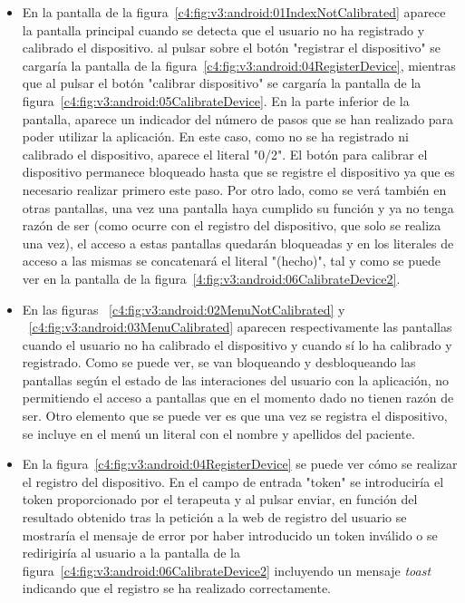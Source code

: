 \begin{itemize}
    \item En la pantalla de la figura~\ref{c4:fig:v3:android:01IndexNotCalibrated} aparece la pantalla principal cuando se detecta que el usuario no ha registrado y calibrado el dispositivo. al pulsar sobre el botón "registrar el dispositivo" se cargaría la pantalla de la figura~\ref{c4:fig:v3:android:04RegisterDevice}, mientras que al pulsar el botón "calibrar dispositivo" se cargaría la pantalla de la figura~\ref{c4:fig:v3:android:05CalibrateDevice}. En la parte inferior de la pantalla, aparece un indicador del número de pasos que se han realizado para poder utilizar la aplicación. En este caso, como no se ha registrado ni calibrado el dispositivo, aparece el literal "0/2". El botón para calibrar el dispositivo permanece bloqueado hasta que se registre el dispositivo ya que es necesario realizar primero este paso. Por otro lado, como se verá también en otras pantallas, una vez una pantalla haya cumplido su función y ya no tenga razón de ser (como ocurre con el registro del dispositivo, que solo se realiza una vez), el acceso a estas pantallas quedarán bloqueadas y en los literales de acceso a las mismas se concatenará el literal "(hecho)", tal y como se puede ver en la pantalla de la figura~\ref{4:fig:v3:android:06CalibrateDevice2}.
    \item En las figuras ~\ref{c4:fig:v3:android:02MenuNotCalibrated} y ~\ref{c4:fig:v3:android:03MenuCalibrated} aparecen respectivamente las pantallas cuando el usuario no ha calibrado el dispositivo y cuando sí lo ha calibrado y registrado. Como se puede ver, se van bloqueando y desbloqueando las pantallas según el estado de las interaciones del usuario con la aplicación, no permitiendo el acceso a pantallas que en el momento dado no tienen razón de ser. Otro elemento que se puede ver es que una vez se registra el dispositivo, se incluye en el menú un literal con el nombre y apellidos del paciente.
    \item En la figura~\ref{c4:fig:v3:android:04RegisterDevice} se puede ver cómo se realizar el registro del dispositivo. En el campo de entrada "token" se introduciría el token proporcionado por el terapeuta y al pulsar enviar, en función del resultado obtenido tras la petición a la web de registro del usuario se mostraría el mensaje de error por haber introducido un token inválido o se redirigiría al usuario a la pantalla de la figura~\ref{c4:fig:v3:android:06CalibrateDevice2} incluyendo un mensaje \textit{toast} indicando que el registro se ha realizado correctamente.
    

\end{itemize}
